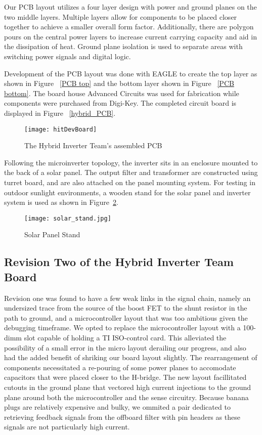 Our PCB layout utilizes a four layer design with power and ground planes on the two middle layers. Multiple layers allow for components to be placed closer together to achieve a smaller overall form factor. Additionally, there are polygon pours on the central power layers to increase current carrying capacity and aid in the dissipation of heat. Ground plane isolation is used to separate areas with switching power signals and digital logic.

Development of the PCB layout was done with EAGLE to create the top layer as shown in Figure ~\ref{PCB top} and the bottom layer shown in Figure ~\ref{PCB bottom}. The board house Advanced Circuits was used for fabrication while components were purchased from Digi-Key. The completed circuit board is displayed in Figure ~\ref{hybrid_PCB}. 
 

\begin{figure}
\centering
\texttt{[image: hitDevBoard]}
\caption{The Hybrid Inverter Team's assembled PCB}
\label{The Hybrid Inverter Team's assembled PCB}
\end{figure}


Following the microinverter topology, the inverter sits in an enclosure mounted to the back of a solar panel. The output filter and transformer are constructed using turret board, and are also attached on the panel mounting system. For testing in outdoor sunlight environments, a wooden stand for the solar panel and inverter system is used as shown in Figure~\ref{solar stand}.

\begin{figure}
\centering
\texttt{[image: solar\_stand.jpg]}
\caption{Solar Panel Stand}
\label{solar stand}
\end{figure}

\subsection{Revision Two of the Hybrid Inverter Team Board}
Revision one was found to have a few weak links in the signal chain, namely an undersized trace from the source of the boost FET to the shunt resistor in the path to ground, and a microcontroller layout that was too ambitious given the debugging timeframe. We opted to replace the microcontroller layout with a 100-dimm slot capable of holding a TI ISO-control card. This alleviated the possibility of a small error in the micro layout derailing our progress, and also had the added benefit of shriking our board layout slightly. The rearrangement of components necessitated a re-pouring of some power planes to accomodate capacitors that were placed closer to the H-bridge. The new layout facillitated cutouts in the ground plane that vectored high current injections to the ground plane around both the microcontroller and the sense circuitry. Because banana plugs are relatively expensive and bulky, we ommited a pair dedicated to retrieving feedback signals from the offboard filter with pin headers as these signals are not particularly high current. 
